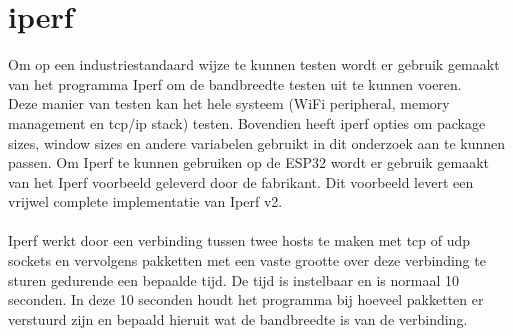 \documentclass[../DCM2_Verslag.tex]{subfiles}
\begin{document}
\section{iperf}
Om op een industriestandaard wijze te kunnen testen wordt er gebruik gemaakt van het programma Iperf om de bandbreedte testen uit te kunnen voeren.\\
Deze manier van testen kan het hele systeem (WiFi peripheral, memory management en tcp/ip stack) testen. Bovendien heeft iperf opties om package sizes, window sizes en andere variabelen gebruikt in dit onderzoek aan te kunnen passen. Om Iperf te kunnen gebruiken op de ESP32 wordt er gebruik gemaakt van het Iperf voorbeeld geleverd door de fabrikant. Dit voorbeeld levert een vrijwel complete implementatie van Iperf v2.\\\\
Iperf werkt door een verbinding tussen twee hosts te maken met tcp of udp sockets en vervolgens pakketten met een vaste grootte over deze verbinding te sturen gedurende een bepaalde tijd. De tijd is instelbaar en is normaal 10 seconden. In deze 10 seconden houdt het programma bij hoeveel pakketten er verstuurd zijn en bepaald hieruit wat de bandbreedte is van de verbinding.\\
\end{document}
